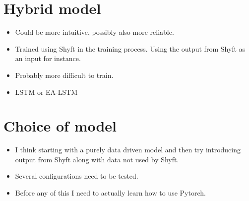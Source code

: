 \documentclass[a4paper,12pt,english]{article}
\begin{document}
\section*{Hybrid model}
\begin{itemize}
\item Could be more intuitive, possibly also more reliable.
\item Trained using Shyft in the training process. Using the output from Shyft as an input for instance.
\item Probably more difficult to train.
\item LSTM or EA-LSTM
\end{itemize}

\section*{Choice of model}
\begin{itemize}
\item I think starting with a purely data driven model and then try introducing output from Shyft along with data not used by Shyft.
\item Several configurations need to be tested.
\item Before any of this I need to actually learn how to use Pytorch.
\end{itemize}



\end{document}
